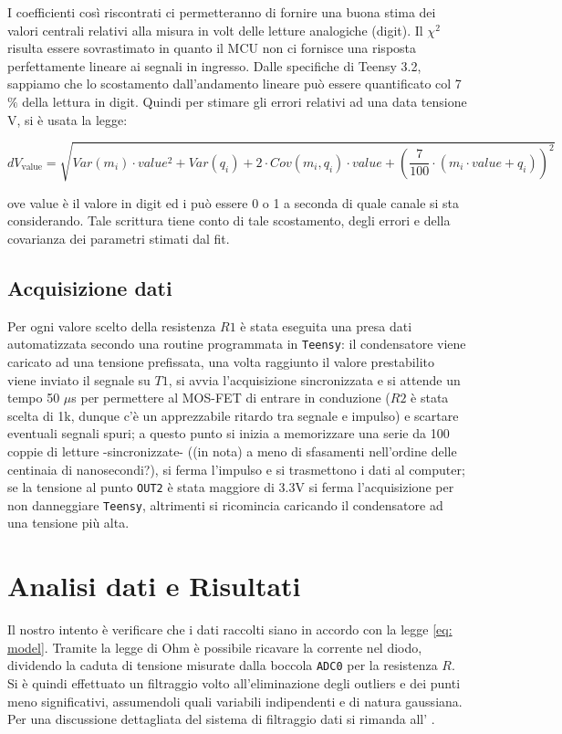 \documentclass{article}[a4paper, oneside, 11pt]
\begin{document}
I coefficienti così riscontrati ci permetteranno di fornire una buona stima dei valori centrali relativi alla misura in volt delle letture analogiche (digit). Il $\chi^2$ risulta essere sovrastimato in quanto il MCU non ci fornisce una risposta perfettamente lineare ai segnali in ingresso. Dalle specifiche di Teensy 3.2, sappiamo che lo scostamento dall’andamento lineare può essere quantificato col 7 $\%$ della lettura in digit. Quindi per stimare gli errori relativi ad una data tensione V, si è usata la legge:

\begin{equation}
{dV}_{\text{value}} =  \sqrt{{Var(m_i)} \cdot {value^2} + {Var(q_i)} + 2 \cdot {Cov(m_i, q_i)} \cdot {value} +({\frac{7}{100}} \cdot (m_i \cdot {value} + q_i))^2}
\end{equation}

ove value è il valore in digit ed i può essere 0 o 1 a seconda di quale canale si sta considerando. Tale scrittura tiene conto di tale scostamento, degli errori e della covarianza dei parametri stimati dal fit. 


\subsection{Acquisizione dati}
Per ogni valore scelto della resistenza $R1$ è stata eseguita una presa dati 
automatizzata secondo una routine programmata in \verb+Teensy+: il condensatore 
viene caricato ad una tensione prefissata, una volta raggiunto il valore 
prestabilito viene inviato il segnale su $T1$, si avvia l'acquisizione 
sincronizzata e si attende un tempo 50 $\mu$s per permettere al MOS-FET di 
entrare in conduzione ($R2$ è stata scelta di 1k, dunque c'è un apprezzabile 
ritardo tra segnale e impulso) e scartare eventuali segnali spuri; a questo 
punto si inizia a memorizzare una serie da 100 coppie di letture 
-sincronizzate- ((in nota) a meno di sfasamenti nell'ordine delle centinaia di 
nanosecondi?), si ferma l'impulso e si trasmettono i dati al computer; se la 
tensione al punto \verb+OUT2+ è stata maggiore di 3.3V si ferma l'acquisizione
per non danneggiare \verb+Teensy+, altrimenti si ricomincia caricando il
condensatore ad una tensione più alta.

\section{Analisi dati e Risultati}
Il nostro intento è verificare che i dati raccolti siano in accordo con la
legge \eqref{eq: model}. Tramite la legge di Ohm è possibile ricavare la
corrente nel diodo, dividendo la caduta di tensione misurate dalla boccola
\verb'ADC0' per la resistenza $R$. Si è quindi effettuato un filtraggio volto
all'eliminazione degli outliers e dei punti meno significativi, assumendoli
quali variabili indipendenti e di natura gaussiana. Per una discussione
dettagliata del sistema di filtraggio dati si rimanda all' .
\end{document}
